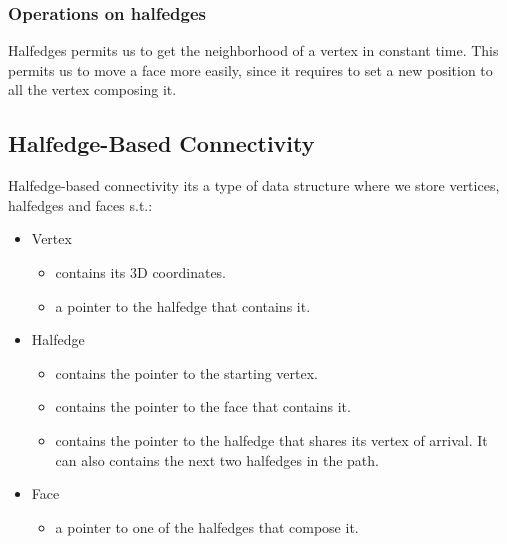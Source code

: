 \subsubsection{Operations on halfedges}
Halfedges permits us to get the neighborhood of a vertex in constant time. This permits us to move a face more easily, since it requires to set a new position to all the vertex composing it.

\subsection{Halfedge-Based Connectivity}
Halfedge-based connectivity its a type of data structure where we store vertices, halfedges and faces s.t.:

\begin{itemize}
    \item Vertex
        \begin{itemize}
            \item contains its 3D coordinates.
            \item a pointer to the halfedge that contains it.
        \end{itemize}
    \item Halfedge
        \begin{itemize}
            \item contains the pointer to the starting vertex.
            \item contains the pointer to the face that contains it.
            \item contains the pointer to the halfedge that shares its vertex of arrival. It can also contains the next two halfedges in the path.
        \end{itemize}
    \item Face
        \begin{itemize}
            \item a pointer to one of the halfedges that compose it.
        \end{itemize}
\end{itemize}